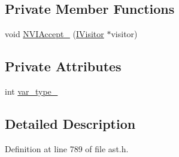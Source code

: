 \subsection*{Private Member Functions}
\begin{DoxyCompactItemize}
\item 
void \hyperlink{classmocha_1_1_variable_stmt_a17244d6a21ec5e47f67b0709c5dad4ee}{NVIAccept\_\-} (\hyperlink{classmocha_1_1_i_visitor}{IVisitor} $\ast$visitor)
\end{DoxyCompactItemize}
\subsection*{Private Attributes}
\begin{DoxyCompactItemize}
\item 
int \hyperlink{classmocha_1_1_variable_stmt_a3fb082b5bf7002e4a647682f68e2033c}{var\_\-type\_\-}
\end{DoxyCompactItemize}


\subsection{Detailed Description}


Definition at line 789 of file ast.h.



